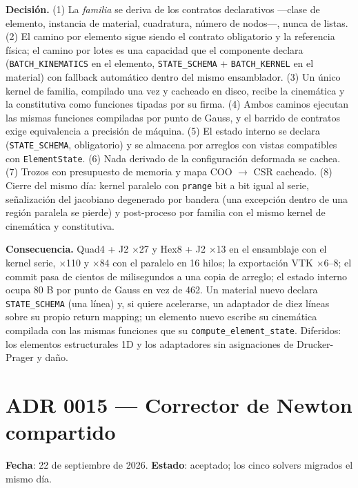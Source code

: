 \documentclass[11pt,oneside]{report}
\begin{document}
\textbf{Decisión.} (1) La \textit{familia} se deriva de los contratos declarativos ---clase de elemento, instancia de material, cuadratura, número de nodos---, nunca de listas. (2) El camino por elemento sigue siendo el contrato obligatorio y la referencia física; el camino por lotes es una capacidad que el componente declara (\texttt{BATCH\_KINEMATICS} en el elemento, \texttt{STATE\_SCHEMA} + \texttt{BATCH\_KERNEL} en el material) con fallback automático dentro del mismo ensamblador. (3) Un único kernel de familia, compilado una vez y cacheado en disco, recibe la cinemática y la constitutiva como funciones tipadas por su firma. (4) Ambos caminos ejecutan las mismas funciones compiladas por punto de Gauss, y el barrido de contratos exige equivalencia a precisión de máquina. (5) El estado interno se declara (\texttt{STATE\_SCHEMA}, obligatorio) y se almacena por arreglos con vistas compatibles con \texttt{ElementState}. (6) Nada derivado de la configuración deformada se cachea. (7) Trozos con presupuesto de memoria y mapa COO \ensuremath{\to} CSR cacheado. (8) Cierre del mismo día: kernel paralelo con \texttt{prange} bit a bit igual al serie, señalización del jacobiano degenerado por bandera (una excepción dentro de una región paralela se pierde) y post-proceso por familia con el mismo kernel de cinemática y constitutiva.

\textbf{Consecuencia.} Quad4 + J2 \ensuremath{\times}27 y Hex8 + J2 \ensuremath{\times}13 en el ensamblaje con el kernel serie, \ensuremath{\times}110 y \ensuremath{\times}84 con el paralelo en 16 hilos; la exportación VTK \ensuremath{\times}6--8; el commit pasa de cientos de milisegundos a una copia de arreglo; el estado interno ocupa 80 B por punto de Gauss en vez de 462. Un material nuevo declara \texttt{STATE\_SCHEMA} (una línea) y, si quiere acelerarse, un adaptador de diez líneas sobre su propio return mapping; un elemento nuevo escribe su cinemática compilada con las mismas funciones que su \texttt{compute\_\allowbreak{}element\_\allowbreak{}state}. Diferidos: los elementos estructurales 1D y los adaptadores sin asignaciones de Drucker-Prager y daño.

\section{ADR 0015 --- Corrector de Newton compartido}
\label{adr:0015}

\textbf{Fecha}: 22 de septiembre de 2026. \textbf{Estado}: aceptado; los cinco solvers migrados el mismo día.
\end{document}
